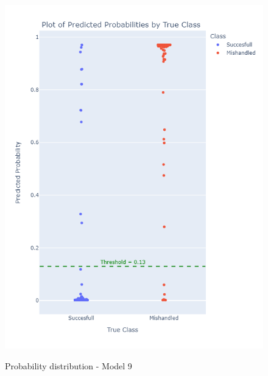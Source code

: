 \documentclass[12pt]{article}
\begin{document}
\begin{figure}
\begin{minipage}[c]{0.4\linewidth}
    \includegraphics[width=1\textwidth]{Probability_distribution_Model 9.png}\\
    \caption{Probability distribution - Model 9}
\end{minipage}
\hfill
\begin{minipage}[c]{0.4\linewidth}

\end{minipage}
\end{figure}
\end{document}
